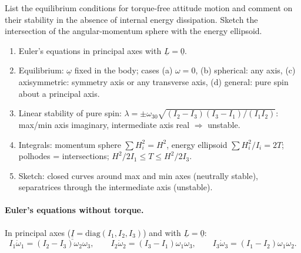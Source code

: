 
\begin{qbox}
List the equilibrium conditions for torque-free attitude motion and comment on their stability in the absence of internal energy
dissipation. Sketch the intersection of the angular-momentum sphere with the energy ellipsoid.
\end{qbox}

\begin{outline}
\begin{enumerate}
\item Euler's equations in principal axes with $\underline L=\underline 0$.
\item Equilibrium: $\underline\omega$ fixed in the body; cases (a) $\omega=0$, (b) spherical: any axis, (c) axisymmetric: symmetry axis or any transverse axis, (d) general: pure spin about a principal axis.
\item Linear stability of pure spin: $\lambda=\pm\omega_{30}\sqrt{(I_2-I_3)(I_3-I_1)/(I_1I_2)}$: max/min axis imaginary, intermediate axis real $\Rightarrow$ unstable.
\item Integrals: momentum sphere $\sum H_i^2=H^2$, energy ellipsoid $\sum H_i^2/I_i=2T$; polhodes = intersections; $H^2/2I_1\le T\le H^2/2I_3$.
\item Sketch: closed curves around max and min axes (neutrally stable), separatrices through the intermediate axis (unstable).
\end{enumerate}
\end{outline}

\answer
\paragraph{Euler's equations without torque.} In principal axes ($\underline{\underline I}=\mathrm{diag}(I_1,I_2,I_3)$) and with $\underline L=\underline 0$:
\begin{equation}
I_{1}\dot{\omega}_{1}=\left(I_{2}-I_{3}\right)\omega_{2}\omega_{3},\qquad
I_{2}\dot{\omega}_{2}=\left(I_{3}-I_{1}\right)\omega_{1}\omega_{3},\qquad
I_{3}\dot{\omega}_{3}=\left(I_{1}-I_{2}\right)\omega_{1}\omega_{2}.
\end{equation}


